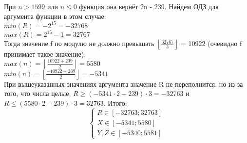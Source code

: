 \noindent При  $n > 1599$ или $n \leq 0$ функция она вернёт 2n - 239. Найдем ОДЗ для аргумента функции в этом случае: \\
$min(R) = -2^{15} = -32768$ \\
$max(R) = 2^{15} - 1 = 32767$ \\
Тогда значение f по модулю не должно превышать $\left\lfloor \frac{32767}{3} \right\rfloor$ = 10922 (очевидно f принимает такое значение). \\
$max(n) = \left\lfloor \frac{10922 + 239}{2} \right\rfloor = 5580$ \\
$min(n) = \left\lfloor \frac{-10922 + 239}{2} \right\rfloor = -5341$ \\
При вышеуказанных значениях аргумента значение R не переполнится, но из-за того, что числа целые, $R \geq (-5341 \cdot 2 - 239) \cdot 3 = -32763$ и $R \leq (5580 \cdot 2 - 239) \cdot 3 = 32763$. Итого: \\
\[
\left\{
\begin{array}{l}
    R \in [-32763; 32763] \\
    X \in [-5341; 5580] \\
    Y, Z \in [-5340; 5581]
\end{array}
\right.
\]
